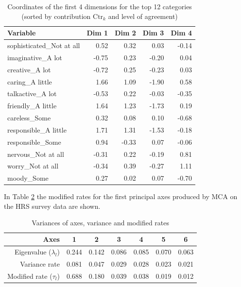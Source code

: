 \documentclass[conference]{IEEEtran}
\begin{document}
\begin{table}[H]
\caption{Coordinates of the first 4 dimensions for the top 12 categories (sorted by contribution $\text{Ctr}_k$ and level of agreement)} 
\centering
\begin{tabular}{lrrrr}
  \hline
  Variable & Dim 1 & Dim 2 & Dim 3 & Dim 4 \\ 
  \hline
  sophisticated\_Not at all & 0.52 & 0.32 & 0.03 & -0.14 \\ 
  imaginative\_A lot & -0.75 & 0.23 & -0.20 & 0.04 \\ 
  creative\_A lot & -0.72 & 0.25 & -0.23 & 0.03 \\ 
  caring\_A little & 1.66 & 1.09 & -1.90 & 0.58 \\ 
  talkactive\_A lot & -0.53 & 0.22 & -0.03 & -0.35 \\ 
  friendly\_A little & 1.64 & 1.23 & -1.73 & 0.19 \\ 
  careless\_Some & 0.32 & 0.08 & 0.10 & -0.68 \\ 
  responsible\_A little & 1.71 & 1.31 & -1.53 & -0.18 \\ 
  responsible\_Some & 0.94 & -0.33 & 0.07 & -0.06 \\ 
  nervous\_Not at all & -0.31 & 0.22 & -0.19 & 0.81 \\ 
  worry\_Not at all & -0.34 & 0.39 & -0.27 & 1.11 \\ 
  moody\_Some & 0.27 & 0.02 & 0.07 & -0.70 \\ 
   \hline
\end{tabular}
\label{tab:top12coord}
\end{table}

In Table \ref{tab:modRate} the modified rates for the first principal
axes produced by MCA on the HRS survey data are shown.

\begin{table}[!ht]
\caption{Variances of axes, variance and modified rates} 
\centering
\begin{tabular}{rcccccc}
  \hline
  Axes & 1 & 2 & 3 & 4 & 5 & 6\\ 
  \hline
  Eigenvalue ($\lambda_l$) & 0.244 & 0.142 & 0.086 & 0.085 & 0.070 & 0.063\\  
  Variance rate                & 0.081 & 0.047 & 0.029 & 0.028 & 0.023 & 0.021\\  
  Modified rate ($\tau_l$) & 0.688 & 0.180 & 0.039 & 0.038 & 0.019 & 0.012\\ 
  \hline
\end{tabular}
\label{tab:modRate}
\end{table}
\end{document}
